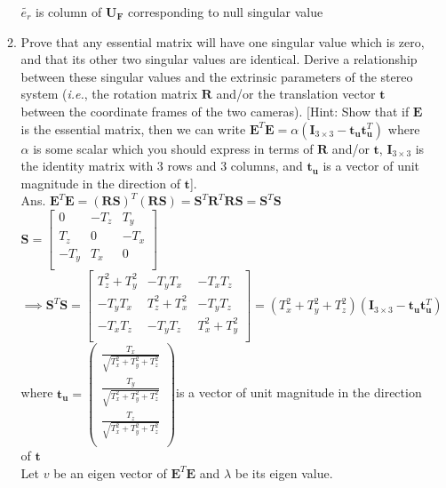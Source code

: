 \documentclass[11pt]{article}
\begin{document}
\begin{enumerate}
\begin{enumerate}
$\tilde{e_r}$ is column of $\textbf{U}_\textbf{F}$ corresponding to null singular value
\item Prove that any essential matrix will have one singular value which is zero, and that its other two singular values are identical. Derive a relationship between these singular values and the extrinsic parameters of the stereo system (\textit{i.e.}, the rotation matrix $\textbf{R}$ and/or the translation vector $\textbf{t}$ between the coordinate frames of the two cameras). [Hint: Show that if $\textbf{E}$ is the essential matrix, then we can write $\textbf{E}^T \textbf{E} = \alpha (\textbf{I}_{3 \times 3} - \textbf{t}_\textbf{u} \textbf{t}^T_\textbf{u})$ where $\alpha$ is some scalar which you should express in terms of $\textbf{R}$ and/or $\textbf{t}$, $\textbf{I}_{3 \times 3}$  is the identity matrix with 3 rows and 3 columns, and $\textbf{t}_\textbf{u}$ is a vector of unit magnitude in the direction of $\textbf{t}$]. \\
Ans. $\textbf{E}^T \textbf{E} = (\textbf{R}\textbf{S})^T(\textbf{R}\textbf{S}) = \textbf{S}^T\textbf{R}^T\textbf{R}\textbf{S} = \textbf{S}^T\textbf{S}$\\
$\textbf{S} = \begin{bmatrix}
0 &-T_z &T_y\\
T_z &0 &-T_x\\
-T_y &T_x &0\\
\end{bmatrix}$\\
$\implies \textbf{S}^T\textbf{S} = \begin{bmatrix}
T_z^2+T_y^2 &-T_yT_x &-T_xT_z\\
-T_yT_x &T_z^2+T_x^2 &-T_yT_z\\
-T_xT_z &-T_yT_z &T_x^2+T_y^2\\
\end{bmatrix} = (T_x^2+T_y^2+T_z^2)(\textbf{I}_{3 \times 3} - \textbf{t}_\textbf{u} \textbf{t}^T_\textbf{u})$ \\where $\textbf{t}_\textbf{u} = \begin{pmatrix}
\frac{T_x}{\sqrt{T_x^2+T_y^2+T_z^2}}\\
\frac{T_y}{\sqrt{T_x^2+T_y^2+T_z^2}}\\
\frac{T_z}{\sqrt{T_x^2+T_y^2+T_z^2}}\\
\end{pmatrix} $is a vector of unit magnitude in the direction of $\textbf{t}$\\
Let $v$ be an eigen vector of $\textbf{E}^T \textbf{E}$ and $\lambda$ be its eigen value.

\end{enumerate}
\end{enumerate}
\end{document}
